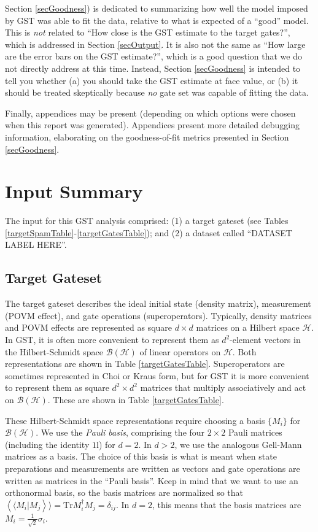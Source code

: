 \documentclass{article}[11pt]
\newcommand{\rrangle}{\rangle\!\rangle} \newcommand{\llangle}{\langle\!\langle}
\newcommand{\sbraket}[2]{\ensuremath{\left\llangle#1|#2\right\rrangle}}
\def\Id{1\!\mathrm{l}}
\newcommand{\Tr}[0]{\mathrm{Tr}}
\newcommand{\putfield}[2]{#2}
\begin{document}
Section \ref{secGoodness}) is dedicated to summarizing how well the model imposed by GST was able to fit the data, relative to what is expected of a ``good'' model.  This is \emph{not} related to ``How close is the GST estimate to the target gates?'', which is addressed in Section \ref{secOutput}.  It is also not the same as ``How large are the error bars on the GST estimate?'', which is a good question that we do not directly address at this time.  Instead, Section \ref{secGoodness} is intended to tell you whether (a) you should take the GST estimate at face value, or (b) it should be treated skeptically because \emph{no} gate set was capable of fitting the data.

Finally, appendices may be present (depending on which options were chosen when this report was generated).  Appendices present more detailed debugging information, elaborating on the goodness-of-fit metrics presented in Section \ref{secGoodness}.

\section{Input Summary\label{secInput}}
The input for this GST analysis comprised: (1) a target gateset (see Tables \ref{targetSpamTable}-\ref{targetGatesTable}); and (2) a dataset called ``\putfield{datasetLabel}{DATASET LABEL HERE}''.

\subsection{Target Gateset}

The target gateset describes the ideal initial state (density matrix), measurement (POVM effect), and gate operations (superoperators).  Typically, density matrices and POVM effects are represented as square $d\times d$ matrices on a Hilbert space $\mathcal{H}$.  In GST, it is often more convenient to represent them as $d^2$-element vectors in the Hilbert-Schmidt space $\mathcal{B}(\mathcal{H})$ of linear operators on $\mathcal{H}$.  Both representations are shown in Table \ref{targetGatesTable}.  Superoperators are sometimes represented in Choi or Kraus form, but for GST it is more convenient to represent them as square $d^2\times d^2$ matrices that multiply associatively and act on $\mathcal{B}(\mathcal{H})$.  These are shown in Table \ref{targetGatesTable}.

These Hilbert-Schmidt space representations require choosing a basis $\{M_i\}$ for $\mathcal{B}(\mathcal{H})$.  We use the \emph{Pauli basis}, comprising the four $2\times2$ Pauli matrices (including the identity $\Id$) for $d=2$.  In $d>2$, we use the analogous Gell-Mann matrices as a basis.   The choice of this basis is what is meant when state preparations and measurements are written as vectors and gate operations are written as matrices in the ``Pauli basis''.  Keep in mind that we want to use an orthonormal basis, so the basis matrices are normalized so that $\sbraket{M_i}{M_j} = \Tr M_i^\dagger M_j = \delta_{ij}$.  In $d=2$, this means that the basis matrices are $M_i = \frac{1}{\sqrt{2}}\sigma_i$.
\end{document}
